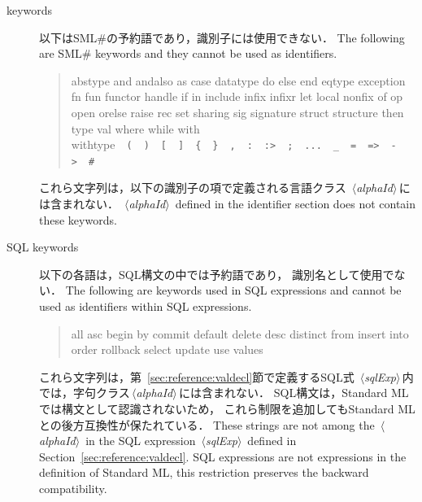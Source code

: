 \documentclass{jbook}
\newcommand{\txt}[2]{#2}
\newcommand{\smlsharp}{SML\#}
\newcommand{\nonterm}[1]{\mbox{$\,\langle$}{\it #1}\mbox{$\rangle\,$}}
\begin{document}
\begin{description}
\item[\txt{予約語}{keywords}] 
\ifjp%
	以下は\smlsharp{}の予約語であり，識別子には使用できない．
\else%
	The following are \smlsharp{} keywords and they cannot be used
as identifiers.
\fi%

\begin{tt}
\begin{quote}
abstype
and
andalso
as
case
datatype
do
else
end
eqtype
exception
fn
fun
functor
handle
if
in
include
infix
infixr
let
local
nonfix
of
op
open
orelse
raise
rec
set
sharing
sig
signature
struct
structure
then
type
val
where
while
with
withtype\ \
\verb|(|\ \
\verb|)|\ \
\verb([(\ \
\verb(](\ \
\verb({(\ \
\verb(}(\ \
\verb(,(\ \
\verb(:(\ \
\verb(:>(\ \
\verb(;(\ \
\verb(...(\ \
\verb(_(\ \
\verb(=(\ \
\verb(=>(\ \
\verb(->(\ \
\verb(#(
\end{quote}
\end{tt}

\ifjp%
	これら文字列は，以下の識別子の項で定義される言語クラス
\nonterm{alphaId}には含まれない．
\else%
	\nonterm{alphaId} defined in the identifier section does not contain
these keywords.
\fi%

\item[\txt{SQL予約語}{SQL keywords}] 
\ifjp%
	以下の各語は，SQL構文の中では予約語であり，
識別名として使用でない．
\else%
	The following are keywords used in SQL expressions and cannot be
used as identifiers within SQL expressions.
\fi%

\begin{tt}
\begin{quote}
all
asc
begin
by
commit
default
delete
desc
distinct
from
insert
into
order
rollback
select
update
use
values
\end{quote}
\end{tt}

\ifjp%
	これら文字列は，第~\ref{sec:reference:valdecl}節で定義するSQL式
\nonterm{sqlExp}内では，字句クラス\nonterm{alphaId}には含まれない．
	SQL構文は，Standard MLでは構文として認識されないため，
これら制限を追加してもStandard MLとの後方互換性が保たれている．
\else%
	These strings are not among the \nonterm{alphaId} in 
the SQL expression \nonterm{sqlExp} defined in Section~\ref{sec:reference:valdecl}.
	SQL expressions are not expressions in the definition of
Standard ML, this restriction preserves the backward compatibility.
\fi%


\end{description}
\end{document}
